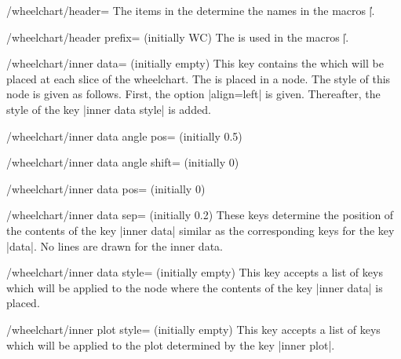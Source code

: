 \documentclass[a4paper,english,dvipsnames]{ltxdoc}
\begin{document}
\begin{key}{/wheelchart/header=}
The items in the  determine the names in the macros |\|.
\end{key}
\begin{key}{/wheelchart/header prefix= (initially WC)}
The  is used in the macros |\|.
\end{key}
\begin{key}{/wheelchart/inner data= (initially \normalfont empty)}
This key contains the  which will be placed at each slice of the wheelchart. The  is placed in a node. The style of this node is given as follows. First, the option |align=left| is given. Thereafter, the style of the key |inner data style| is added.
\end{key}
\begin{key}{/wheelchart/inner data angle pos= (initially 0.5)}
\end{key}
\begin{key}{/wheelchart/inner data angle shift= (initially 0)}
\end{key}
\begin{key}{/wheelchart/inner data pos= (initially 0)}
\end{key}
\begin{key}{/wheelchart/inner data sep= (initially 0.2)}
These keys determine the position of the contents of the key |inner data| similar as the corresponding keys for the key |data|. No lines are drawn for the inner data.
\end{key}
\begin{stylekey}{/wheelchart/inner data style= (initially \normalfont empty)}
This key accepts a list of keys which will be applied to the node where the contents of the key |inner data| is placed.
\end{stylekey}
\begin{stylekey}{/wheelchart/inner plot style= (initially \normalfont empty)}
This key accepts a list of keys which will be applied to the plot determined by the key |inner plot|.
\end{stylekey}
\end{document}
